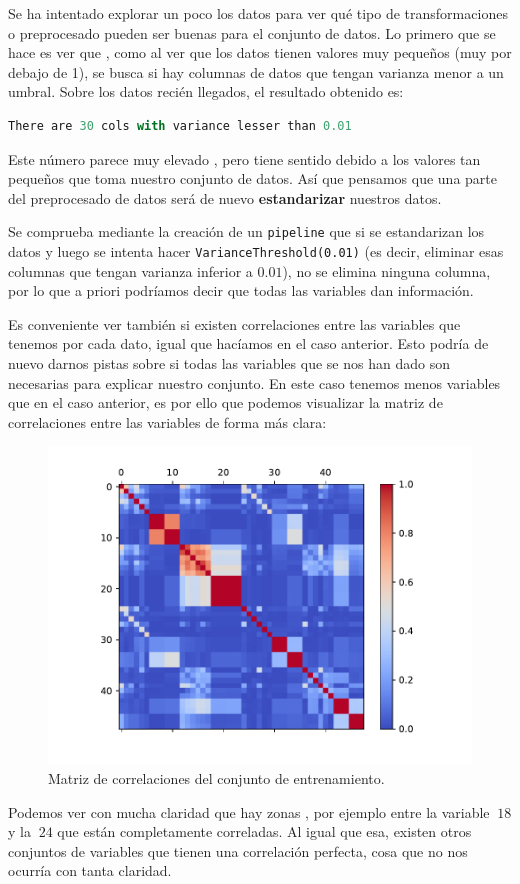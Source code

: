 \documentclass[a4paper, 20pt]{article}
\begin{document}
Se ha intentado explorar un poco los datos para ver qué tipo de transformaciones o preprocesado pueden ser buenas para el conjunto de datos. Lo primero que se hace es ver que , como al ver que los datos tienen valores muy pequeños (muy por debajo de 1), se busca si hay columnas de datos que tengan varianza menor a un umbral. Sobre los datos recién llegados, el resultado obtenido es:
\begin{lstlisting}[language=Python]
  There are 30 cols with variance lesser than 0.01
\end{lstlisting}
Este número parece muy elevado , pero tiene sentido debido a los valores tan pequeños que toma nuestro conjunto de datos. Así que pensamos que una parte del preprocesado de datos será de nuevo \textbf{estandarizar} nuestros datos.

Se comprueba mediante la creación de un \lstinline{pipeline} que si se estandarizan los datos y luego se intenta hacer \lstinline{VarianceThreshold(0.01)} (es decir, eliminar esas columnas que tengan varianza inferior a $0.01$), no se elimina ninguna columna, por lo que a priori podríamos decir que todas las variables dan información.

Es conveniente ver también si existen correlaciones entre las variables que tenemos por cada dato, igual que hacíamos en el caso anterior. Esto podría de nuevo darnos pistas sobre si todas las variables que se nos han dado son necesarias para explicar nuestro conjunto. En este caso tenemos menos variables que en el caso anterior, es por ello que podemos visualizar la matriz de correlaciones entre las variables de forma más clara:

\begin{figure}[H]
  \centering
  \includegraphics[width=0.55\linewidth]{media/corr-standarized-classification.pdf}
  \caption{Matriz de correlaciones del conjunto de entrenamiento. }
  \label{fig:class-numbers}
\end{figure}

Podemos ver con mucha claridad que hay zonas , por ejemplo entre la variable $~18$ y la $~24$ que están completamente correladas. Al igual que esa, existen otros conjuntos de variables que tienen una correlación perfecta, cosa que no nos ocurría con tanta claridad.
\end{document}
